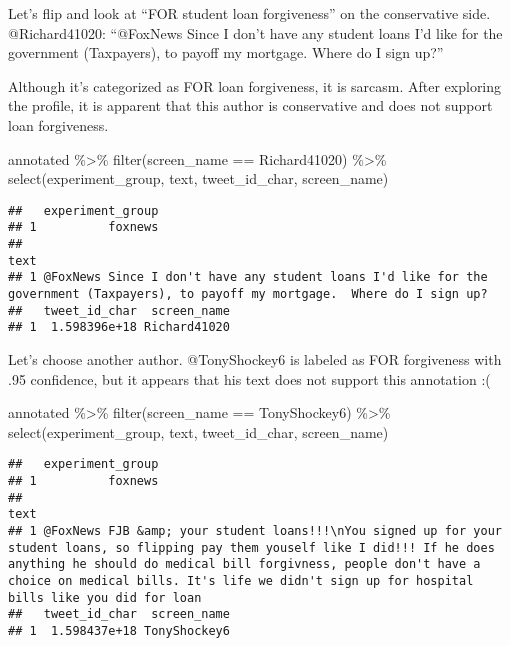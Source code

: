 \documentclass[
]{article}
\newenvironment{Shaded}{\begin{snugshade}}{\end{snugshade}}
\newcommand{\FunctionTok}[1]{\textcolor[rgb]{0.00,0.00,0.00}{#1}}
\newcommand{\NormalTok}[1]{#1}
\newcommand{\SpecialCharTok}[1]{\textcolor[rgb]{0.00,0.00,0.00}{#1}}
\newcommand{\StringTok}[1]{\textcolor[rgb]{0.31,0.60,0.02}{#1}}
\begin{document}
Let's flip and look at ``FOR student loan forgiveness'' on the
conservative side. @Richard41020: ``@FoxNews Since I don't have any
student loans I'd like for the government (Taxpayers), to payoff my
mortgage. Where do I sign up?''

Although it's categorized as FOR loan forgiveness, it is sarcasm. After
exploring the profile, it is apparent that this author is conservative
and does not support loan forgiveness.

\begin{Shaded}
\begin{Highlighting}[]
\NormalTok{annotated }\SpecialCharTok{\%\textgreater{}\%} \FunctionTok{filter}\NormalTok{(screen\_name }\SpecialCharTok{==} \StringTok{\textquotesingle{}Richard41020\textquotesingle{}}\NormalTok{) }\SpecialCharTok{\%\textgreater{}\%} \FunctionTok{select}\NormalTok{(experiment\_group, text, tweet\_id\_char, screen\_name)}
\end{Highlighting}
\end{Shaded}

\begin{verbatim}
##   experiment_group
## 1          foxnews
##                                                                                                                                 text
## 1 @FoxNews Since I don't have any student loans I'd like for the government (Taxpayers), to payoff my mortgage.  Where do I sign up?
##   tweet_id_char  screen_name
## 1  1.598396e+18 Richard41020
\end{verbatim}

Let's choose another author. @TonyShockey6 is labeled as FOR forgiveness
with .95 confidence, but it appears that his text does not support this
annotation :(

\begin{Shaded}
\begin{Highlighting}[]
\NormalTok{annotated }\SpecialCharTok{\%\textgreater{}\%} \FunctionTok{filter}\NormalTok{(screen\_name }\SpecialCharTok{==} \StringTok{\textquotesingle{}TonyShockey6\textquotesingle{}}\NormalTok{) }\SpecialCharTok{\%\textgreater{}\%} \FunctionTok{select}\NormalTok{(experiment\_group, text, tweet\_id\_char, screen\_name)}
\end{Highlighting}
\end{Shaded}

\begin{verbatim}
##   experiment_group
## 1          foxnews
##                                                                                                                                                                                                                                                                                                     text
## 1 @FoxNews FJB &amp; your student loans!!!\nYou signed up for your student loans, so flipping pay them youself like I did!!! If he does anything he should do medical bill forgivness, people don't have a choice on medical bills. It's life we didn't sign up for hospital bills like you did for loan
##   tweet_id_char  screen_name
## 1  1.598437e+18 TonyShockey6
\end{verbatim}
\end{document}
